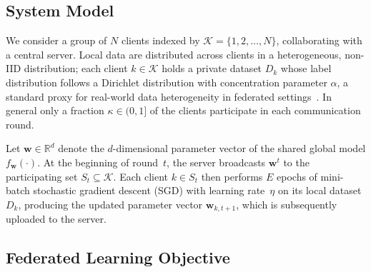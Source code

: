 \documentclass[journal]{IEEEtran}
\begin{document}
\subsection{System Model}

We consider a group of $N$ clients indexed by $\mathcal{K} = \{1, 2, \ldots, N\}$, collaborating with a central server. Local data are distributed across clients in a heterogeneous, non-IID distribution; each client $k \in \mathcal{K}$ holds a private dataset $D_k$ whose label distribution follows a Dirichlet distribution with concentration parameter $\alpha$, a standard proxy for real-world data heterogeneity in federated settings~\cite{hsieh2020non}. In general only a fraction $\kappa \in (0, 1]$ of the clients participate in each communication round.

Let $\mathbf{w} \in \mathbb{R}^d$ denote the $d$-dimensional parameter vector of the shared global model $f_{\mathbf{w}}(\cdot)$. At the beginning of round~$t$, the server broadcasts $\mathbf{w}^t$ to the participating set $S_t \subseteq \mathcal{K}$. Each client $k \in S_t$ then performs $E$ epochs of mini-batch stochastic gradient descent (SGD) with learning rate~$\eta$ on its local dataset $D_k$, producing the updated parameter vector $\mathbf{w}_{k,t+1}$, which is subsequently uploaded to the server.

\subsection{Federated Learning Objective}
\end{document}
